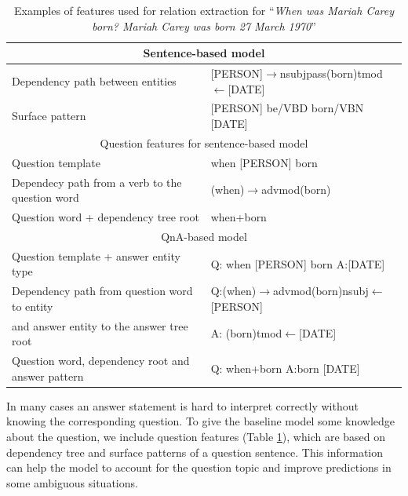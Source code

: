 \begin{table}[tbh]
\centering
\caption{Examples of features used for relation extraction for ``\emph{When was Mariah Carey born? Mariah Carey was born 27 March 1970}''}
\vspace{-2mm}
\label{table:qna_relextract:features}
\begin{tabular}{|p{8cm}|p{8cm}|}
\hline
\multicolumn{2}{|c|}{Sentence-based model}\\
\hline
Dependency path between entities & [PERSON]$\rightarrow$nsubjpass(born)tmod$\leftarrow$[DATE]\\
Surface pattern & [PERSON] be/VBD born/VBN [DATE]\\
\hline
\hline
\multicolumn{2}{|c|}{Question features for sentence-based model}\\
\hline
Question template & when [PERSON] born\\
Dependecy path from a verb to the question word & (when)$\rightarrow$advmod(born)\\
Question word + dependency tree root & when+born\\
\hline
\hline
\multicolumn{2}{|c|}{QnA-based model}\\
\hline
Question template + answer entity type & Q: when [PERSON] born A:[DATE]\\
Dependency path from question word to entity & Q:(when)$\rightarrow$advmod(born)nsubj$\leftarrow$[PERSON]\\
and answer entity to the answer tree root & A: (born)tmod$\leftarrow$[DATE]\\
Question word, dependency root and answer pattern & Q: when+born A:born [DATE]\\
\hline
\end{tabular}
\end{table}

In many cases an answer statement is hard to interpret correctly without knowing the corresponding question.
To give the baseline model some knowledge about the question, we include question features (Table \ref{table:qna_relextract:features}), which are based on dependency tree and surface patterns of a question sentence. 
This information can help the model to account for the question topic and improve predictions in some ambiguous situations.

